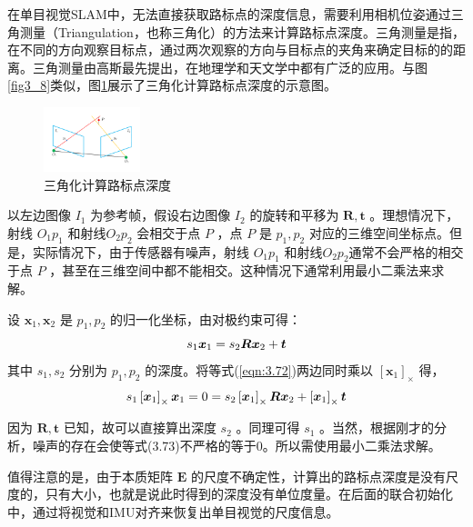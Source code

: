 在单目视觉SLAM中，无法直接获取路标点的深度信息，需要利用相机位姿通过三角测量（Triangulation，也称三角化）的方法来计算路标点深度。三角测量是指，在不同的方向观察目标点，通过两次观察的方向与目标点的夹角来确定目标的的距离。三角测量由高斯最先提出，在地理学和天文学中都有广泛的应用。与图\ref{fig3_8}类似，图\ref{fig3_10}展示了三角化计算路标点深度的示意图。
\begin{figure}[h]\setlength{\belowcaptionskip}{-12pt}
	\centering
	\includegraphics[width=0.25\textwidth, angle=-90]{figures/chapter3/fig3_10}
	\caption{三角化计算路标点深度}\label{fig3_10}
\end{figure}

以左边图像 $I_1 $ 为参考帧，假设右边图像  $I_2 $ 的旋转和平移为 $\boldsymbol{R}, \boldsymbol{t} $ 。理想情况下，射线 $O_1p_1 $ 和射线$O_2p_2 $ 会相交于点 $P$ ，点 $P$ 是 $p_1,p_2 $ 对应的三维空间坐标点。但是，实际情况下，由于传感器有噪声，射线 $O_1p_1 $ 和射线$O_2p_2 $通常不会严格的相交于点 $P$ ，甚至在三维空间中都不能相交。这种情况下通常利用最小二乘法来求解。

设 $\boldsymbol{x}_{1}, \boldsymbol{x}_{2} $ 是 $p_1,p_2 $ 的归一化坐标，由对极约束可得：
\begin{equation}
\label{eqn:3.72}
\setlength{\abovedisplayskip}{6pt}
\setlength{\belowdisplayskip}{6pt}
s_{1} \boldsymbol{x}_{1}=s_{2} \boldsymbol{R} \boldsymbol{x}_{2}+\boldsymbol{t}
\end{equation}
其中 $s_{1}, s_{2} $ 分别为 $p_1,p_2 $ 的深度。将等式(\ref{eqn:3.72})两边同时乘以 $\left[ \bm{x}_1 \right]_\times$ 得，
\begin{equation}
\label{eqn:3.73}
\setlength{\abovedisplayskip}{6pt}
\setlength{\belowdisplayskip}{6pt}
s_{1} \left[\boldsymbol{x}_{1}\right]_\times \boldsymbol{x}_{1}=0=s_{2} \left[\boldsymbol{x}_{1}\right]_\times \boldsymbol{R} \boldsymbol{x}_{2}+ \left[\boldsymbol{x}_{1}\right]_\times \boldsymbol{t}
\end{equation}

因为 $\boldsymbol{R}, \boldsymbol{t} $ 已知，故可以直接算出深度 $s_2 $ 。同理可得 $s_1 $ 。当然，根据刚才的分析，噪声的存在会使等式(3.73)不严格的等于0。所以需使用最小二乘法求解。

值得注意的是，由于本质矩阵 $\bm{E} $ 的尺度不确定性，计算出的路标点深度是没有尺度的，只有大小，也就是说此时得到的深度没有单位度量。在后面的联合初始化中，通过将视觉和IMU对齐来恢复出单目视觉的尺度信息。

